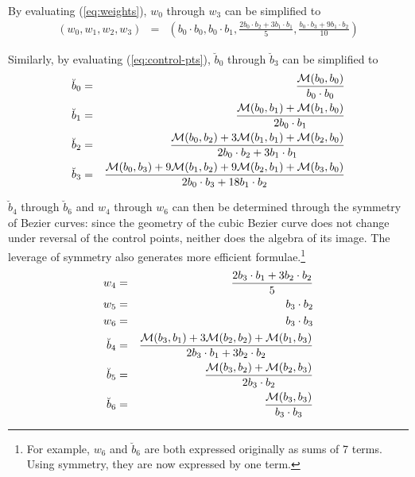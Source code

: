 \documentclass[11pt]{article}
\begin{document}
By evaluating (\ref{eq:weights}), $w_0$ through $w_3$ can be simplified to
\begin{eqnarray}
(w_0,w_1,w_2,w_3) & = & 
(b_0 \cdot b_0, b_0 \cdot b_1, \frac{2b_0 \cdot b_2 + 3b_1 \cdot b_1}{5}, 
\frac{b_0 \cdot b_3 + 9b_1 \cdot b_2}{10}) \nonumber 
\end{eqnarray}

Similarly, by evaluating (\ref{eq:control-pts}), $\breve{b}_0$ through $\breve{b}_3$ 
can be simplified to 
\begin{eqnarray}
\breve{b}_0 & = & %
                    \frac{{\cal M}(b_0,b_0)}{b_0 \cdot b_0} \nonumber \\
\breve{b}_1 & = & %
                    \frac{{\cal M}(b_0,b_1) + {\cal M}(b_1,b_0)}{2b_0\cdot b_1} \nonumber \\
\breve{b}_2 & = & %
                    \frac{{\cal M}(b_0,b_2) + 3{\cal M}(b_1,b_1) + {\cal M}(b_2,b_0)}
	                 {2b_0 \cdot b_2 + 3b_1 \cdot b_1} \nonumber \\
\breve{b}_3 & = & %
                    \frac{{\cal M}(b_0,b_3) + 9{\cal M}(b_1,b_2) + 9{\cal M}(b_2,b_1) + {\cal M}(b_3,b_0)}{2b_0 \cdot b_3 + 18b_1 \cdot b_2} \nonumber
\end{eqnarray}

$\breve{b}_4$ through $\breve{b}_6$ and $w_4$ through $w_6$ can then be determined 
through the symmetry of Bezier curves: 
since the geometry of the cubic Bezier curve does not change 
under reversal of the control points, neither does the algebra of its image.
The leverage of symmetry also generates more efficient formulae.\footnote{For example,
  $w_6$ and $\breve{b}_6$ are both expressed originally as sums of 7 terms.
  Using symmetry, they are now expressed by one term.}
\begin{eqnarray}
w_4 & = & \frac{2b_3 \cdot b_1 + 3b_2 \cdot b_2}{5} \nonumber \\
w_5 & = & b_3 \cdot b_2 \nonumber \\
w_6 & = & b_3 \cdot b_3 \nonumber \\
\breve{b}_4 & = & \frac{{\cal M}(b_3,b_1) + 3{\cal M}(b_2,b_2) + {\cal M}(b_1,b_3)}
	                 {2b_3 \cdot b_1 + 3b_2 \cdot b_2} \nonumber \\
\breve{b}_5 & = & \frac{{\cal M}(b_3,b_2) + {\cal M}(b_2,b_3)}{2b_3\cdot b_2} \nonumber \\
\breve{b}_6 & = & \frac{{\cal M}(b_3,b_3)}{b_3 \cdot b_3} \nonumber
\end{eqnarray}
\QED
\end{document}
